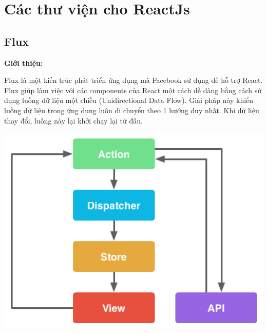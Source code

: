 \section{Các thư viện cho ReactJs}

\subsection{Flux}
\begin{center}
  \captionsetup{type=figure}
  
\end{center}
\textbf{Giới thiệu:}

Flux là một kiến trúc phát triển ứng dụng mà Facebook sử dụng để hỗ trợ React. Flux giúp làm việc với các components của React một cách dễ dàng bằng cách sử dụng luồng dữ liệu một chiều (Unidirectional Data Flow). Giải pháp này khiến luồng dữ liệu trong ứng dụng luôn di chuyển theo 1 hướng duy nhất. Khi dữ liệu thay đổi, luồng này lại khởi chạy lại từ đầu.
\begin{center}
  \captionsetup{type=figure}
  \includegraphics[width=14cm]{img/flux-flow}
\end{center}

